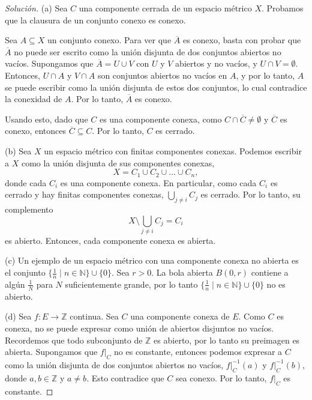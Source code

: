 \begin{proof}[Solución]
    (a) Sea $C$ una componente cerrada de un espacio métrico $X$. Probamos que la clausura de un conjunto conexo es conexo. 

    Sea $A \subseteq X$ un conjunto conexo. Para ver que $\overline{A}$ es conexo, basta con probar que $\overline{A}$ no puede ser escrito como la unión disjunta de dos conjuntos abiertos no vacíos. Supongamos que $\overline{A} = U \cup V$ con $U$ y $V$ abiertos y no vacíos, y $U \cap V = \emptyset$. Entonces, $U \cap A$ y $V \cap A$ son conjuntos abiertos no vacíos en $A$, y por lo tanto, $A$ se puede escribir como la unión disjunta de estos dos conjuntos, lo cual contradice la conexidad de $A$. Por lo tanto, $\overline{A}$ es conexo.

    Usando esto, dado que $C$ es una componente conexa, como $C \cap \overline{C} \neq \emptyset$ y $\overline{C}$ es conexo, entonces $\overline{C} \subseteq C$. Por lo tanto, $C$ es cerrado.

    (b) Sea $X$ un espacio métrico con finitas componentes conexas. Podemos escribir a $X$ como la unión disjunta de sus componentes conexas,
    \begin{equation*}
        X = C_1 \cup C_2 \cup \dots \cup C_n,
    \end{equation*}
    donde cada $C_i$ es una componente conexa. En particular, como cada $C_i$ es cerrado y hay finitas componentes conexas, $\bigcup_{j \neq i} C_j$ es cerrado. Por lo tanto, su complemento 
    \begin{equation*}
        X \setminus \bigcup_{j \neq i} C_j = C_i
    \end{equation*}
    es abierto. Entonces, cada componente conexa es abierta.

    (c) Un ejemplo de un espacio métrico con una componente conexa no abierta es el conjunto $\{ \frac{1}{n} \mid n \in \mathbb{N} \} \cup \{ 0 \}$. Sea $r > 0$. La bola abierta $B(0, r)$ contiene a algún $\frac{1}{N}$ para $N$ suficientemente grande, por lo tanto $\{ \frac{1}{n} \mid n \in \mathbb{N} \} \cup \{ 0 \}$ no es abierto.
    
    (d) Sea $f : E \to \mathbb{Z}$ continua. Sea $C$ una componente conexa de $E$. Como $C$ es conexa, no se puede expresar como unión de abiertos disjuntos no vacíos. Recordemos que todo subconjunto de $\mathbb{Z}$ es abierto, por lo tanto su preimagen es abierta. Supongamos que $f|_C$ no es constante, entonces podemos expresar a $C$ como la unión disjunta de dos conjuntos abiertos no vacíos, $f|_C^{-1}(a)$ y $f|_C^{-1}(b)$, donde $a, b \in \mathbb{Z}$ y $a \neq b$. Esto contradice que $C$ sea conexo. Por lo tanto, $f|_C$ es constante.
\end{proof}